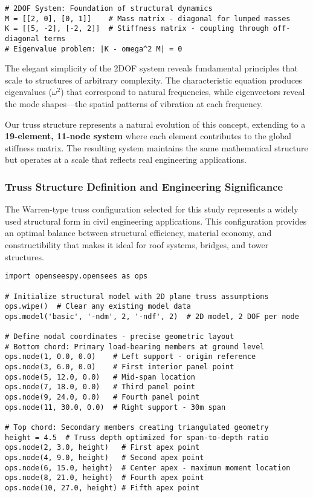 \documentclass[11pt,a4paper]{article}
\begin{document}
\begin{lstlisting}[caption={2DOF System Foundation}]
# 2DOF System: Foundation of structural dynamics
M = [[2, 0], [0, 1]]    # Mass matrix - diagonal for lumped masses
K = [[5, -2], [-2, 2]]  # Stiffness matrix - coupling through off-diagonal terms
# Eigenvalue problem: |K - omega^2 M| = 0
\end{lstlisting}

The elegant simplicity of the 2DOF system reveals fundamental principles that scale to structures of arbitrary complexity. The characteristic equation produces eigenvalues ($\omega^2$) that correspond to natural frequencies, while eigenvectors reveal the mode shapes—the spatial patterns of vibration at each frequency.

Our truss structure represents a natural evolution of this concept, extending to a \textbf{19-element, 11-node system} where each element contributes to the global stiffness matrix. The resulting system maintains the same mathematical structure but operates at a scale that reflects real engineering applications.

\subsubsection{Truss Structure Definition and Engineering Significance}

The Warren-type truss configuration selected for this study represents a widely used structural form in civil engineering applications. This configuration provides an optimal balance between structural efficiency, material economy, and constructibility that makes it ideal for roof systems, bridges, and tower structures.

\begin{lstlisting}[caption={OpenSeesPy Truss Model Initialization}]
import openseespy.opensees as ops

# Initialize structural model with 2D plane truss assumptions
ops.wipe()  # Clear any existing model data
ops.model('basic', '-ndm', 2, '-ndf', 2)  # 2D model, 2 DOF per node

# Define nodal coordinates - precise geometric layout
# Bottom chord: Primary load-bearing members at ground level
ops.node(1, 0.0, 0.0)    # Left support - origin reference
ops.node(3, 6.0, 0.0)    # First interior panel point
ops.node(5, 12.0, 0.0)   # Mid-span location
ops.node(7, 18.0, 0.0)   # Third panel point
ops.node(9, 24.0, 0.0)   # Fourth panel point
ops.node(11, 30.0, 0.0)  # Right support - 30m span

# Top chord: Secondary members creating triangulated geometry
height = 4.5  # Truss depth optimized for span-to-depth ratio
ops.node(2, 3.0, height)   # First apex point
ops.node(4, 9.0, height)   # Second apex point
ops.node(6, 15.0, height)  # Center apex - maximum moment location
ops.node(8, 21.0, height)  # Fourth apex point
ops.node(10, 27.0, height) # Fifth apex point
\end{lstlisting}
\end{document}

